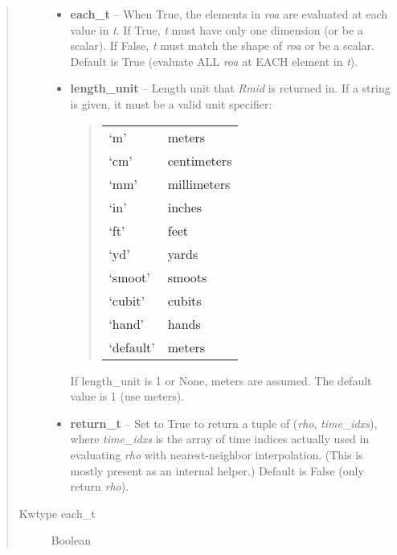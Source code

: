 \documentclass[letterpaper,10pt,english]{sphinxmanual}
\begin{document}
\begin{fulllineitems}
\begin{fulllineitems}
\begin{quote}
\begin{description}
\begin{itemize}
\item {} 
\textbf{each\_t} -- When True, the elements in \emph{roa} are evaluated
at each value in \emph{t}. If True, \emph{t} must have only one dimension
(or be a scalar). If False, \emph{t} must match the shape of \emph{roa}
or be a scalar. Default is True (evaluate ALL \emph{roa} at EACH
element in \emph{t}).

\item {} 
\textbf{length\_unit} -- 
Length unit that \emph{Rmid} is returned in.
If a string is given, it must be a valid unit specifier:
\begin{quote}

\begin{tabulary}{\linewidth}{|L|L|}
\hline

`m'
 & 
meters
\\

`cm'
 & 
centimeters
\\

`mm'
 & 
millimeters
\\

`in'
 & 
inches
\\

`ft'
 & 
feet
\\

`yd'
 & 
yards
\\

`smoot'
 & 
smoots
\\

`cubit'
 & 
cubits
\\

`hand'
 & 
hands
\\

`default'
 & 
meters
\\
\hline\end{tabulary}

\end{quote}

If length\_unit is 1 or None, meters are assumed. The default
value is 1 (use meters).


\item {} 
\textbf{return\_t} -- Set to True to return a tuple of (\emph{rho},
\emph{time\_idxs}), where \emph{time\_idxs} is the array of time indices
actually used in evaluating \emph{rho} with nearest-neighbor
interpolation. (This is mostly present as an internal helper.)
Default is False (only return \emph{rho}).

\end{itemize}

\item[{Kwtype each\_t}] \leavevmode
Boolean


\end{description}
\end{quote}
\end{fulllineitems}
\end{fulllineitems}
\end{document}
